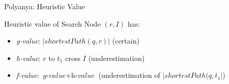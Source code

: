 \begin{frame}{Polyanya: Heuristic Value}
\begin{minipage}{.4\textwidth}
\small Heuristic value of Search Node $(r, I)$ has:
\begin{itemize}
    \item \small \textit{g-value}: $|shortestPath(q, r)|$ (certain)
    \item \small \textit{h-value}: $r$ to $t_1$ cross $I$ (underestimation)
    \item \small \textit{f-value}: $\textit{g-value} + \textit{h-value}$ (underestimation of $|shortestPath(q, t_1|$)
\end{itemize}
\end{minipage}%
\begin{minipage}{.6\textwidth}
    \begin{adjustbox}{max totalsize={.9\textwidth}{.9\textheight}, right}
    \end{adjustbox}
\end{minipage}
\end{frame}


